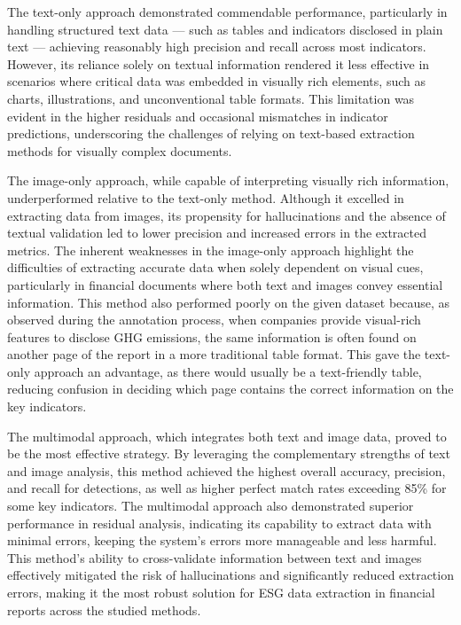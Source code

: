 \documentclass[english, 12pt, a4paper, elec, utf8, a-2b, online]{aaltothesis}
\begin{document}
The text-only approach demonstrated commendable performance, particularly in handling structured text data --- such as tables and indicators disclosed in plain text --- achieving reasonably high precision and recall across most indicators.
However, its reliance solely on textual information rendered it less effective in scenarios where critical data was embedded in visually rich elements, such as charts, illustrations, and unconventional table formats.
This limitation was evident in the higher residuals and occasional mismatches in indicator predictions, underscoring the challenges of relying on text-based extraction methods for visually complex documents.

The image-only approach, while capable of interpreting visually rich information, underperformed relative to the text-only method.
Although it excelled in extracting data from images, its propensity for hallucinations and the absence of textual validation led to lower precision and increased errors in the extracted metrics.
The inherent weaknesses in the image-only approach highlight the difficulties of extracting accurate data when solely dependent on visual cues, particularly in financial documents where both text and images convey essential information.
This method also performed poorly on the given dataset because, as observed during the annotation process, when companies provide visual-rich features to disclose \ac{GHG} emissions, the same information is often found on another page of the report in a more traditional table format.
This gave the text-only approach an advantage, as there would usually be a text-friendly table, reducing confusion in deciding which page contains the correct information on the key indicators.

The multimodal approach, which integrates both text and image data, proved to be the most effective strategy.
By leveraging the complementary strengths of text and image analysis, this method achieved the highest overall accuracy, precision, and recall for detections, as well as higher perfect match rates exceeding 85\% for some key indicators.
The multimodal approach also demonstrated superior performance in residual analysis, indicating its capability to extract data with minimal errors, keeping the system's errors more manageable and less harmful.
This method's ability to cross-validate information between text and images effectively mitigated the risk of hallucinations and significantly reduced extraction errors, making it the most robust solution for \ac{ESG} data extraction in financial reports across the studied methods.
\end{document}
